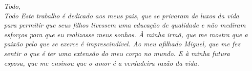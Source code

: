 
\begin{dedicatoria}

    \vspace*{\fill}
    \centering
    \noindent
    \textit{\lang
    {
        Todo, \\
        Todo
    }
    {
      Este trabalho é dedicado aos meus pais, que
      se privaram de luxos da vida para permitir
      que seus filhos tivessem uma educação de qualidade e
      não mediram esforços para que eu realizasse
      meus sonhos. À minha irmã, que me mostra que a
      paixão pelo que se exerce é imprescindível.
      Ao meu afilhado Miguel, que me fez sentir o que é
      ter uma extensão do meu corpo no mundo. E à minha
      futura esposa, que me ensinou que o amor é a verdadeira
      razão da vida.
    }}
    \vspace*{\fill}

\end{dedicatoria}


